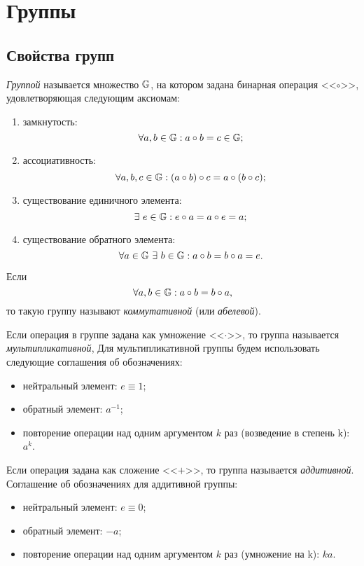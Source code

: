 \section{Группы}\label{section-groups}

\subsection{Свойства групп}

\emph{Группой} называется множество $\mathbb{G}$, на котором задана бинарная операция <<$\circ$>>, удовлетворяющая следующим аксиомам:
\begin{enumerate}
    \item замкнутость:
        \[ \forall a,b \in \mathbb{G}: a \circ b = c \in \mathbb{G}; \]
    \item ассоциативность:
        \[ \forall a,b,c \in \mathbb{G}: (a \circ b) \circ c = a \circ (b \circ c); \]
    \item существование единичного элемента:
        \[ \exists ~ e \in \mathbb{G}: e\circ a = a \circ e = a; \]
    \item существование обратного элемента:
        \[ \forall a \in \mathbb{G} ~ \exists ~ b \in \mathbb{G}: a \circ b = b \circ a = e. \]
\end{enumerate}
Если
    \[ \forall a,b \in \mathbb{G}: a \circ b = b \circ a, \]
то такую группу называют \emph{коммутативной} (или \emph{абелевой}).

Если операция в группе задана как умножение <<$\cdot$>>, то группа называется \emph{мультипликативной}, Для мультипликативной группы будем использовать следующие соглашения об обозначениях:
\begin{itemize}
	\item нейтральный элемент: $e \equiv 1$;
	\item обратный элемент: $a^{-1}$;
	\item повторение операции над одним аргументом $k$ раз (возведение в степень k): $a^k$.
\end{itemize}

Если операция задана как сложение <<$+$>>, то группа называется \emph{аддитивной}. Соглашение об обозначениях для аддитивной группы:
\begin{itemize}
	\item нейтральный элемент: $e \equiv 0$;
	\item обратный элемент: $-a$;
	\item повторение операции над одним аргументом $k$ раз (умножение на k): $ka$.
\end{itemize}

